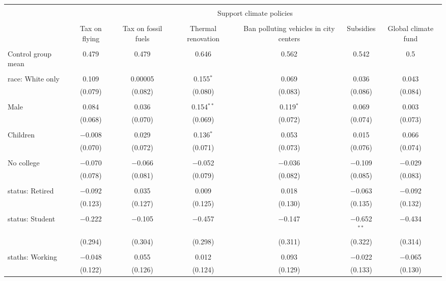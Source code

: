
\begin{tabular}{@{\extracolsep{5pt}}lcccccc} 
\\[-1.8ex]\hline 
\hline \\[-1.8ex] 
 & \multicolumn{6}{c}{Support climate policies} \\ 
\cline{2-7} 
\\[-1.8ex] & Tax on flying & Tax on fossil fuels & Thermal renovation & Ban polluting vehicles in city centers & Subsidies & Global climate fund \\ 
\hline \\[-1.8ex] 
 Control group mean & 0.479 & 0.479 & 0.646 & 0.562 & 0.542 & 0.5  \\ \hline \\[-1.8ex] race: White only & 0.109 & 0.00005 & 0.155$^{*}$ & 0.069 & 0.036 & 0.043 \\ 
  & (0.079) & (0.082) & (0.080) & (0.083) & (0.086) & (0.084) \\ 
  & & & & & & \\ 
 Male & 0.084 & 0.036 & 0.154$^{**}$ & 0.119$^{*}$ & 0.069 & 0.003 \\ 
  & (0.068) & (0.070) & (0.069) & (0.072) & (0.074) & (0.073) \\ 
  & & & & & & \\ 
 Children & $-$0.008 & 0.029 & 0.136$^{*}$ & 0.053 & 0.015 & 0.066 \\ 
  & (0.070) & (0.072) & (0.071) & (0.073) & (0.076) & (0.074) \\ 
  & & & & & & \\ 
 No college & $-$0.070 & $-$0.066 & $-$0.052 & $-$0.036 & $-$0.109 & $-$0.029 \\ 
  & (0.078) & (0.081) & (0.079) & (0.082) & (0.085) & (0.083) \\ 
  & & & & & & \\ 
 status: Retired & $-$0.092 & 0.035 & 0.009 & 0.018 & $-$0.063 & $-$0.092 \\ 
  & (0.123) & (0.127) & (0.125) & (0.130) & (0.135) & (0.132) \\ 
  & & & & & & \\ 
 status: Student & $-$0.222 & $-$0.105 & $-$0.457 & $-$0.147 & $-$0.652$^{**}$ & $-$0.434 \\ 
  & (0.294) & (0.304) & (0.298) & (0.311) & (0.322) & (0.314) \\ 
  & & & & & & \\ 
 staths: Working & $-$0.048 & 0.055 & 0.012 & 0.093 & $-$0.022 & $-$0.065 \\ 
  & (0.122) & (0.126) & (0.124) & (0.129) & (0.133) & (0.130) \\ 

\end{tabular}
